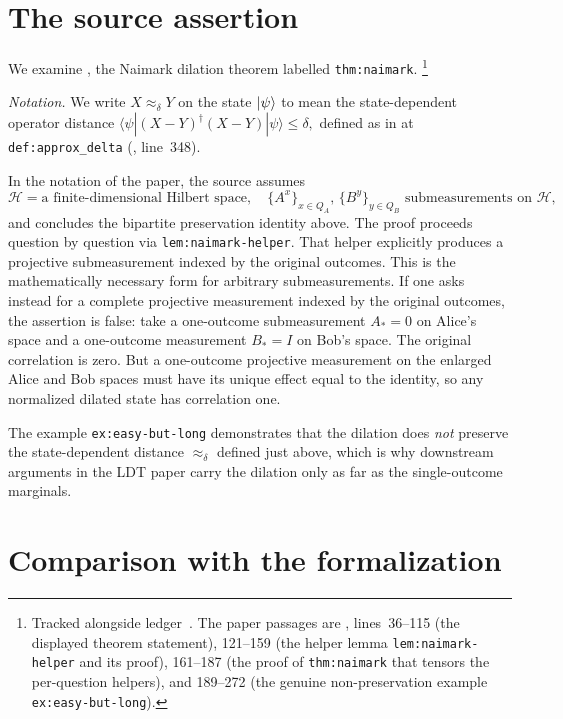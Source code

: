 \documentclass[11pt]{article}
\begin{document}
\section{The source assertion}

We examine \cite{Ji2020LowIndividualDegree}, the Naimark dilation theorem
labelled \texttt{thm:naimark}.%
\footnote{Tracked alongside ledger~.  The paper passages are
, lines~36--115 (the displayed
theorem statement), 121--159 (the helper lemma \texttt{lem:naimark-helper} and
its proof), 161--187 (the proof of \texttt{thm:naimark} that tensors the
per-question helpers), and 189--272 (the genuine non-preservation example
\texttt{ex:easy-but-long}).}

\medskip

\noindent\emph{Notation.}  We write $X\approx_\delta Y$ on the state $\ket\psi$
to mean the state-dependent operator distance
\(
  \langle\psi|(X-Y)^{\dagger}(X-Y)|\psi\rangle\le\delta,
\)
defined as in \cite{Ji2020LowIndividualDegree} at
\texttt{def:approx\_delta} (, line~348).

\medskip

In the notation of the paper, the source assumes
\[
  \mathcal H=\text{a finite-dimensional Hilbert space},
  \quad \{A^x\}_{x\in Q_A},\,\{B^y\}_{y\in Q_B}\text{ submeasurements on }\mathcal H,
\]
and concludes the bipartite preservation identity above.  The proof proceeds
question by question via \texttt{lem:naimark-helper}.  That helper explicitly
produces a projective submeasurement indexed by the original outcomes.  This is
the mathematically necessary form for arbitrary submeasurements.  If one asks
instead for a complete projective measurement indexed by the original outcomes,
the assertion is false: take a one-outcome submeasurement $A_*=0$ on Alice's
space and a one-outcome measurement $B_*=I$ on Bob's space.  The original
correlation is zero.  But a one-outcome projective measurement on the enlarged
Alice and Bob spaces must have its unique effect equal to the identity, so any
normalized dilated state has correlation one.

The example
\texttt{ex:easy-but-long} demonstrates that the dilation does \emph{not}
preserve the state-dependent distance $\approx_\delta$ defined just above,
which is why downstream arguments in the LDT paper carry the dilation only as
far as the single-outcome marginals.

\section{Comparison with the formalization}
\end{document}
